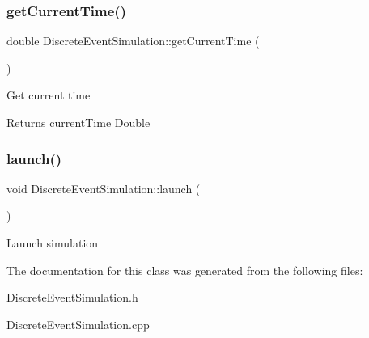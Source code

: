 \subsubsection{\texorpdfstring{get\+Current\+Time()}{getCurrentTime()}}
{\footnotesize\ttfamily double Discrete\+Event\+Simulation\+::get\+Current\+Time (\begin{DoxyParamCaption}{ }\end{DoxyParamCaption})}

Get current time \begin{DoxyReturn}{Returns}
current\+Time Double 
\end{DoxyReturn}
\mbox{\label{classDiscreteEventSimulation_aae616e227950798dc958171210975713}} 
\subsubsection{\texorpdfstring{launch()}{launch()}}
{\footnotesize\ttfamily void Discrete\+Event\+Simulation\+::launch (\begin{DoxyParamCaption}{ }\end{DoxyParamCaption})}

Launch simulation 

The documentation for this class was generated from the following files\+:\begin{DoxyCompactItemize}
\item 
Discrete\+Event\+Simulation.\+h\item 
Discrete\+Event\+Simulation.\+cpp\end{DoxyCompactItemize}
